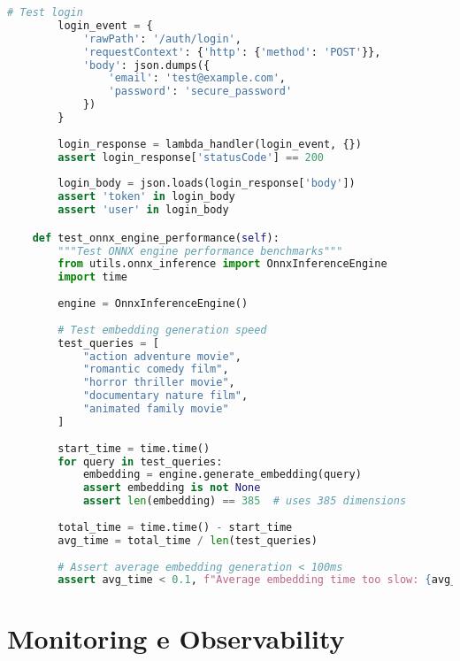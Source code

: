 \documentclass[11pt,a4paper]{article}
\begin{document}
\begin{lstlisting}[language=Python, caption=Test Lambda Handler]
        # Test login
        login_event = {
            'rawPath': '/auth/login',
            'requestContext': {'http': {'method': 'POST'}},
            'body': json.dumps({
                'email': 'test@example.com',
                'password': 'secure_password'
            })
        }
        
        login_response = lambda_handler(login_event, {})
        assert login_response['statusCode'] == 200
        
        login_body = json.loads(login_response['body'])
        assert 'token' in login_body
        assert 'user' in login_body

    def test_onnx_engine_performance(self):
        """Test ONNX engine performance benchmarks"""
        from utils.onnx_inference import OnnxInferenceEngine
        import time
        
        engine = OnnxInferenceEngine()
        
        # Test embedding generation speed
        test_queries = [
            "action adventure movie",
            "romantic comedy film",
            "horror thriller movie",
            "documentary nature film",
            "animated family movie"
        ]
        
        start_time = time.time()
        for query in test_queries:
            embedding = engine.generate_embedding(query)
            assert embedding is not None
            assert len(embedding) == 385  # uses 385 dimensions
        
        total_time = time.time() - start_time
        avg_time = total_time / len(test_queries)
        
        # Assert average embedding generation < 100ms
        assert avg_time < 0.1, f"Average embedding time too slow: {avg_time:.3f}s"
\end{lstlisting}

\section{Monitoring e Observability}
\end{document}
